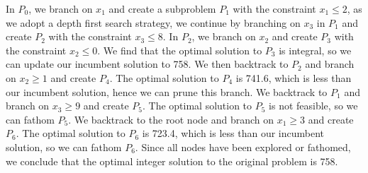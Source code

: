 In $P_0$, we branch on $x_1$ and create a subproblem $P_1$ with the constraint $x_1 \le 2$, as we adopt a depth first search strategy, we continue by branching on $x_3$ in $P_1$ and create $P_2$ with the constraint $x_3 \le 8$. In $P_2$, we branch on $x_2$ and create $P_3$ with the constraint $x_2 \le 0$. We find that the optimal solution to $P_3$ is integral, so we can update our incumbent solution to 758. We then backtrack to $P_2$ and branch on $x_2 \ge 1$ and create $P_4$. The optimal solution to $P_4$ is 741.6, which is less than our incumbent solution, hence we can prune this branch. We backtrack to $P_1$ and branch on $x_3 \ge 9$ and create $P_5$. The optimal solution to $P_5$ is not feasible, so we can fathom $P_5$. We backtrack to the root node and branch on $x_1 \ge 3$ and create $P_6$. The optimal solution to $P_6$ is 723.4, which is less than our incumbent solution, so we can fathom $P_6$. Since all nodes have been explored or fathomed, we conclude that the optimal integer solution to the original problem is 758.

